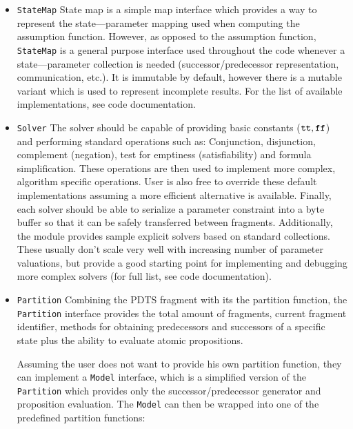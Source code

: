 \begin{itemize}
	\item \texttt{StateMap} State map is a simple map interface which provides a way to represent the state—parameter mapping used when computing the assumption function. However, as opposed to the assumption function, \texttt{StateMap} is a general purpose interface used throughout the code whenever a state—parameter collection is needed (successor/predecessor representation, communication, etc.). It is immutable by default, however there is a mutable variant which is used to represent incomplete results. For the list of available implementations, see code documentation.
	
	\item \texttt{Solver} The solver should be capable of providing basic constants ($\texttt{tt}, \texttt{ff}$) and performing standard operations such as: Conjunction, disjunction, complement (negation), test for emptiness (satisfiability) and formula simplification. These operations are then used to implement more complex, algorithm specific operations. User is also free to override these default implementations assuming a more efficient alternative is available. Finally, each solver should be able to serialize a parameter constraint into a byte buffer so that it can be safely transferred between fragments. Additionally, the module provides sample explicit solvers based on standard collections. These usually don't scale very well with increasing number of parameter valuations, but provide a good starting point for implementing and debugging more complex solvers (for full list, see code documentation).
	
	\item \texttt{Partition} Combining the \ac{PDTS} fragment with its the partition function, the \texttt{Partition} interface provides the total amount of fragments, current fragment identifier, methods for obtaining predecessors and successors of a specific state plus the ability to evaluate atomic propositions.
	
	Assuming the user does not want to provide his own partition function, they can implement a \texttt{Model} interface, which is a simplified version of the \texttt{Partition} which provides only the successor/predecessor generator and proposition evaluation. The \texttt{Model} can then be wrapped into one of the predefined partition functions:
	

\end{itemize}
